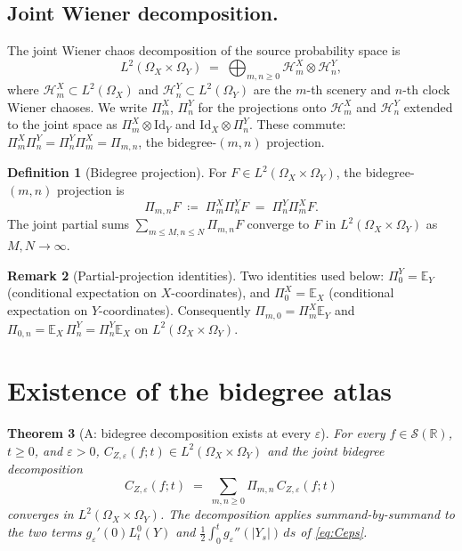 \documentclass[11pt,reqno]{amsart}
\theoremstyle{plain}
\newtheorem{theorem}{Theorem}[section]
\theoremstyle{definition}
\newtheorem{definition}[theorem]{Definition}
\newtheorem{remark}[theorem]{Remark}
\theoremstyle{remark}
\newcommand{\R}{\mathbb{R}}
\newcommand{\E}{\mathbb{E}}
\newcommand{\Hilb}{\mathcal{H}}
\newcommand{\IBM}{Z}
\newcommand{\Pir}{\Pi}
\begin{document}
\subsection*{Joint Wiener decomposition.}
The joint Wiener chaos decomposition of the source probability space
is
\begin{equation}\label{eq:joint-chaos}
 L^{2}(\Omega_X\times\Omega_Y)
 \;=\;\bigoplus_{m,n\ge 0}\Hilb_m^X\otimes\Hilb_n^Y,
\end{equation}
where $\Hilb_m^X\subset L^{2}(\Omega_X)$ and
$\Hilb_n^Y\subset L^{2}(\Omega_Y)$ are the $m$-th scenery and
$n$-th clock Wiener chaoses. We write $\Pir_m^X$, $\Pir_n^Y$ for
the projections onto $\Hilb_m^X$ and $\Hilb_n^Y$ extended to the
joint space as $\Pir_m^X\otimes\mathrm{Id}_Y$ and
$\mathrm{Id}_X\otimes\Pir_n^Y$. These commute:
$\Pir_m^X\Pir_n^Y=\Pir_n^Y\Pir_m^X=\Pir_{m,n}$, the bidegree-$(m,n)$
projection.

\begin{definition}[Bidegree projection]\label{def:bidegree}
For $F\in L^{2}(\Omega_X\times\Omega_Y)$, the bidegree-$(m,n)$
projection is
\[
 \Pir_{m,n}F\;\coloneqq\;\Pir_m^X\Pir_n^Y F
 \;=\;\Pir_n^Y\Pir_m^X F.
\]
The joint partial sums $\sum_{m\le M,n\le N}\Pir_{m,n}F$ converge to
$F$ in $L^{2}(\Omega_X\times\Omega_Y)$ as $M,N\to\infty$.
\end{definition}

\begin{remark}[Partial-projection identities]\label{rem:partial}
Two identities used below: $\Pir_0^Y=\E_Y$ (conditional expectation
on $X$-coordinates), and $\Pir_0^X=\E_X$ (conditional expectation on
$Y$-coordinates). Consequently $\Pir_{m,0}=\Pir_m^X\E_Y$ and
$\Pir_{0,n}=\E_X\,\Pir_n^Y=\Pir_n^Y\E_X$ on
$L^{2}(\Omega_X\times\Omega_Y)$.
\end{remark}

\section{Existence of the bidegree atlas}\label{sec:atlas}

\begin{theorem}[A: bidegree decomposition exists at every \texorpdfstring{$\varepsilon$}{epsilon}]
\label{thm:atlas}
For every $f\in\mathscr S(\R)$, $t\ge 0$, and $\varepsilon>0$,
$C_{\IBM,\varepsilon}(f;t)\in L^{2}(\Omega_X\times\Omega_Y)$ and the
joint bidegree decomposition
\begin{equation}\label{eq:atlas-conv}
 C_{\IBM,\varepsilon}(f;t)
 \;=\;\sum_{m,n\ge 0}\Pir_{m,n}\,C_{\IBM,\varepsilon}(f;t)
\end{equation}
converges in $L^{2}(\Omega_X\times\Omega_Y)$. The decomposition
applies summand-by-summand to the two terms
$g_\varepsilon'(0)L_t^0(Y)$ and
$\tfrac12\!\int_0^t g_\varepsilon''(|Y_s|)\,ds$ of
\eqref{eq:Ceps}.
\end{theorem}
\end{document}
